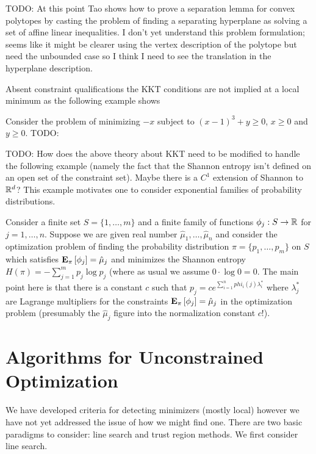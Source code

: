 TODO: At this point Tao shows how to prove a separation lemma for convex polytopes by casting the problem of finding a separating hyperplane as solving a set of affine linear inequalities.  
I don't yet understand this problem formulation; seems like it might be clearer using the vertex description of the polytope but need the unbounded case so I think I need to see the translation
in the hyperplane description.

Absent constraint qualifications the KKT conditions are not implied at a local minimum as the following example shows
\begin{examp}Consider the problem of minimizing $-x$ subject to $(x-1)^3 + y \geq 0$, $x \geq 0$ and $y \geq 0$.
TODO:
\end{examp}


TODO:  How does the above theory about KKT need to be modified to
handle the following example (namely the fact that the Shannon entropy isn't defined on an open
set of the constraint set).  Maybe there is a $C^1$ extension of Shannon to $\mathbb{R}^d$?  This example motivates one to consider exponential families of probability distributions.
\begin{examp}\label{MaximumEntropyPrinciple}Consider a finite set $S=\lbrace 1, \dotsc, m \rbrace$ and a finite family
of functions $\phi_j : S \to \mathbb{R}$ for $j=1, \dotsc, n$.  Suppose we are given real number $\hat{\mu}_1, \dotsc, \hat{\mu}_n$ and 
consider the optimization problem of finding the probability distribution $\pi = \lbrace p_1, \dotsc, p_m \rbrace$ on $S$ which satisfies
$\textbf{E}_{\pi}\left [\phi_j \right] = \hat{\mu}_j$ and minimizes the Shannon entropy $H(\pi) = -\sum_{j=1}^m p_j \log p_j$ (where as usual we assume $0 \cdot \log 0 = 0$.
The main point here is that there is a constant $c$ such that $p_j = c e^{\sum_{i=1}^n phi_i(j) \lambda_i^*}$ where $\lambda^*_j$ are Lagrange multipliers for the
constraints $\textbf{E}_{\pi}\left [\phi_j \right] = \hat{\mu}_j$  in the optimization problem (presumably the $\hat{\mu}_j$ figure into the normalization constant $c$!).
\end{examp}

\section{Algorithms for Unconstrained Optimization}

We have developed criteria for detecting minimizers (mostly local)
however we have not yet addressed the issue of how we might find one.
There are two basic paradigms to consider: line search and trust
region methods.  We first consider line search.

